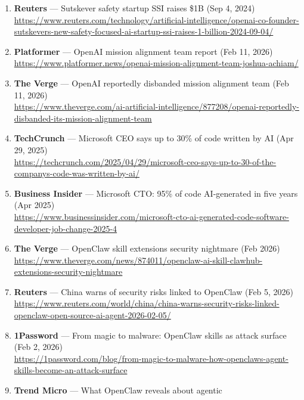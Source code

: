 \documentclass[11pt]{article}
\begin{document}
\begin{enumerate}
  25, 2024)\\
  \url{https://www.reuters.com/technology/artificial-intelligence/openais-technology-chief-mira-murati-leave-2024-09-25/}
\item
  \textbf{Reuters} --- Sutskever safety startup SSI raises \$1B (Sep 4,
  2024)\\
  \url{https://www.reuters.com/technology/artificial-intelligence/openai-co-founder-sutskevers-new-safety-focused-ai-startup-ssi-raises-1-billion-2024-09-04/}
\item
  \textbf{Platformer} --- OpenAI mission alignment team report (Feb 11,
  2026)\\
  \url{https://www.platformer.news/openai-mission-alignment-team-joshua-achiam/}
\item
  \textbf{The Verge} --- OpenAI reportedly disbanded mission alignment
  team (Feb 11, 2026)\\
  \url{https://www.theverge.com/ai-artificial-intelligence/877208/openai-reportedly-disbanded-its-mission-alignment-team}
\item
  \textbf{TechCrunch} --- Microsoft CEO says up to 30\% of code written
  by AI (Apr 29, 2025)\\
  \url{https://techcrunch.com/2025/04/29/microsoft-ceo-says-up-to-30-of-the-companys-code-was-written-by-ai/}
\item
  \textbf{Business Insider} --- Microsoft CTO: 95\% of code AI-generated
  in five years (Apr 2025)\\
  \url{https://www.businessinsider.com/microsoft-cto-ai-generated-code-software-developer-job-change-2025-4}
\item
  \textbf{The Verge} --- OpenClaw skill extensions security nightmare
  (Feb 2026)\\
  \url{https://www.theverge.com/news/874011/openclaw-ai-skill-clawhub-extensions-security-nightmare}
\item
  \textbf{Reuters} --- China warns of security risks linked to OpenClaw
  (Feb 5, 2026)\\
  \url{https://www.reuters.com/world/china/china-warns-security-risks-linked-openclaw-open-source-ai-agent-2026-02-05/}
\item
  \textbf{1Password} --- From magic to malware: OpenClaw skills as
  attack surface (Feb 2, 2026)\\
  \url{https://1password.com/blog/from-magic-to-malware-how-openclaws-agent-skills-become-an-attack-surface}
\item
  \textbf{Trend Micro} --- What OpenClaw reveals about agentic

\end{enumerate}
\end{document}

